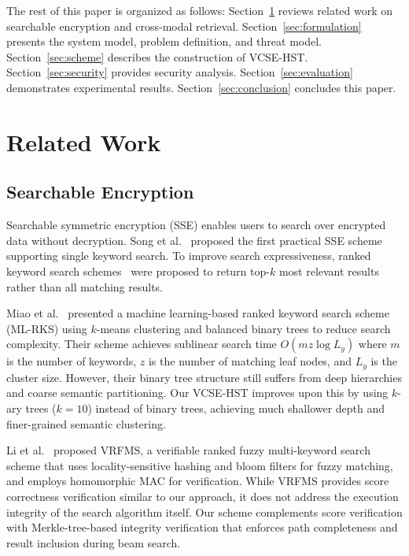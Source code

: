 \documentclass[journal]{IEEEtran}
\begin{document}
The rest of this paper is organized as follows: Section~\ref{sec:related} reviews related work on searchable encryption and cross-modal retrieval. Section~\ref{sec:formulation} presents the system model, problem definition, and threat model. Section~\ref{sec:scheme} describes the construction of VCSE-HST. Section~\ref{sec:security} provides security analysis. Section~\ref{sec:evaluation} demonstrates experimental results. Section~\ref{sec:conclusion} concludes this paper.

\section{Related Work}
\label{sec:related}

\subsection{Searchable Encryption}

Searchable symmetric encryption (SSE) enables users to search over encrypted data without decryption. Song et al.~\cite{song2000practical} proposed the first practical SSE scheme supporting single keyword search. To improve search expressiveness, ranked keyword search schemes~\cite{cao2014privacy,wang2016secure} were proposed to return top-$k$ most relevant results rather than all matching results.

Miao et al.~\cite{miao2022ranked} presented a machine learning-based ranked keyword search scheme (ML-RKS) using $k$-means clustering and balanced binary trees to reduce search complexity. Their scheme achieves sublinear search time $O(mz\log L_y)$ where $m$ is the number of keywords, $z$ is the number of matching leaf nodes, and $L_y$ is the cluster size. However, their binary tree structure still suffers from deep hierarchies and coarse semantic partitioning. Our VCSE-HST improves upon this by using $k$-ary trees ($k=10$) instead of binary trees, achieving much shallower depth and finer-grained semantic clustering.

Li et al.~\cite{li2022vrfms} proposed VRFMS, a verifiable ranked fuzzy multi-keyword search scheme that uses locality-sensitive hashing and bloom filters for fuzzy matching, and employs homomorphic MAC for verification. While VRFMS provides score correctness verification similar to our approach, it does not address the execution integrity of the search algorithm itself. Our scheme complements score verification with Merkle-tree-based integrity verification that enforces path completeness and result inclusion during beam search.
\end{document}
